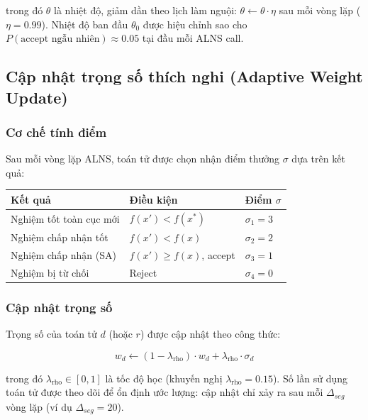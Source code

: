 \documentclass[12pt]{article}
\begin{document}
trong đó $\theta$ là nhiệt độ, giảm dần theo lịch làm nguội: $\theta \gets \theta \cdot \eta$ sau mỗi vòng lặp ($\eta = 0.99$). Nhiệt độ ban đầu $\theta_0$ được hiệu chỉnh sao cho $P(\text{accept ngẫu nhiên}) \approx 0.05$ tại đầu mỗi ALNS call.

\subsection{Cập nhật trọng số thích nghi (Adaptive Weight Update)}

\subsubsection*{Cơ chế tính điểm}

Sau mỗi vòng lặp ALNS, toán tử được chọn nhận điểm thưởng $\sigma$ dựa trên kết quả:

\begin{center}
\begin{tabular}{lll}
\toprule
\textbf{Kết quả} & \textbf{Điều kiện} & \textbf{Điểm $\sigma$} \\
\midrule
Nghiệm tốt toàn cục mới & $f(x') < f(x^*)$ & $\sigma_1 = 3$ \\
Nghiệm chấp nhận tốt & $f(x') < f(x)$ & $\sigma_2 = 2$ \\
Nghiệm chấp nhận (SA) & $f(x') \geq f(x)$, accept & $\sigma_3 = 1$ \\
Nghiệm bị từ chối & Reject & $\sigma_4 = 0$ \\
\bottomrule
\end{tabular}
\end{center}

\subsubsection*{Cập nhật trọng số}

Trọng số của toán tử $d$ (hoặc $r$) được cập nhật theo công thức:

\begin{equation}
  w_d \gets (1 - \lambda_{\text{rho}}) \cdot w_d + \lambda_{\text{rho}} \cdot \sigma_d
  \label{eq:weight_update}
\end{equation}

trong đó $\lambda_{\text{rho}} \in [0,1]$ là tốc độ học (khuyến nghị $\lambda_{\text{rho}} = 0.15$). Số lần sử dụng toán tử được theo dõi để ổn định ước lượng: cập nhật chỉ xảy ra sau mỗi $\Delta_{seg}$ vòng lặp (ví dụ $\Delta_{seg} = 20$).
\end{document}

